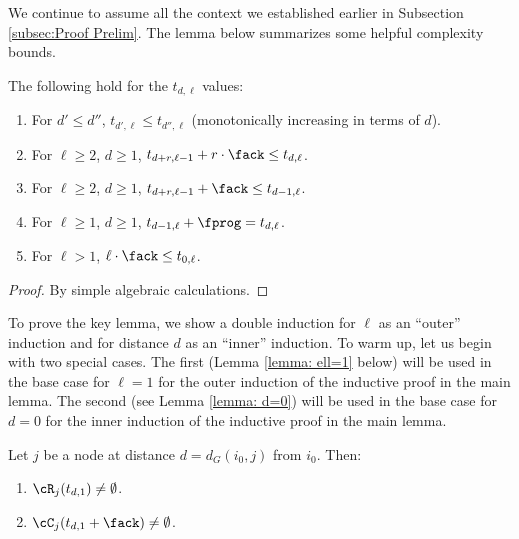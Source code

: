 We continue to assume all the context we established earlier in Subsection \ref{subsec:Proof Prelim}.
The lemma below summarizes some helpful complexity bounds.

\begin{lemma}
\label{lemma:bmmb: t d ell values}
\label{lemma: t-inequalities}
The following hold for the $t_{d,\ell}$ values:
  \begin{enumerate}
  \item For $d'\leq d''$, $t_{d',\ell} \leq t_{d'',\ell} $ (monotonically increasing in terms of $d$).
  \label{item:lemma: t dl monotonically increasing}



  \item For $\ell\geq 2$, $d\geq 1$, $t_{d+r,\ell-1} + r\cdot \fack \leq t_{d,\ell}$.
  \label{item:lemma com-bounds r fack}

  \item For $\ell\geq 2$, $d\geq 1$, $t_{d+r,\ell-1} + \fack \leq t_{d-1,\ell}$.
  \label{item:lemma com-bounds fack t d+r ell-1 + Fack leq t d-1 ell}


  \item For $\ell\geq 1$, $d\geq 1$, $t_{d-1,\ell} + \fprog = t_{d,\ell}$.
  \label{item:lemma com-bounds fprog}

  \item For $\ell > 1$, $\ell\cdot \fack \leq t_{0,\ell} $.
  \label{item:t- t0 + ell fack leq t 0 ell}


  \end{enumerate}
\end{lemma}


\begin{proof}
By simple algebraic calculations.
\end{proof}


To prove the key lemma, we show a double induction
for $\ell$ as an ``outer'' induction and for distance $d$ as an ``inner'' induction.
To warm up, let us begin with two special cases.
The first (Lemma \ref{lemma: ell=1} below) will be used in the base case for $\ell=1$ for the outer induction of the inductive proof
in the main lemma.
The second (see Lemma \ref{lemma: d=0}) will be used in the base case for $d=0$ for the inner induction of the inductive proof
in the main lemma.


\begin{lemma}
\label{lemma: ell=1}
Let $j$ be a node at distance $d=d_G(i_0,j)$ from $i_0$.
Then:
\begin{enumerate}
\item
$\cR_j(t_{d,1}) \neq \emptyset$.
\item
$\cC_j(t_{d,1} + \fack) \neq \emptyset$.
\end{enumerate}
\end{lemma}

